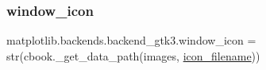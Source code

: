 \subsubsection{\texorpdfstring{window\+\_\+icon}{window\_icon}}
{\footnotesize\ttfamily matplotlib.\+backends.\+backend\+\_\+gtk3.\+window\+\_\+icon = str(cbook.\+\_\+get\+\_\+data\+\_\+path(\textquotesingle{}images\textquotesingle{}, \hyperlink{namespacematplotlib_1_1backends_1_1backend__gtk3_a77525c76e1f137bd35eb0b4faca11603}{icon\+\_\+filename}))}

